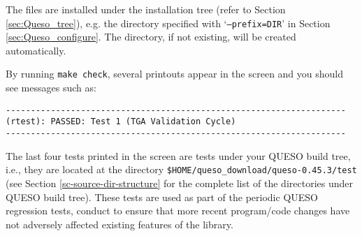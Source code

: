 The files are installed under the installation tree (refer to Section \ref{sec:Queso_tree}), e.g. the directory specified with `\texttt{--prefix=DIR}' in Section \ref{sec:Queso_configure}. The directory, if not existing, will be created automatically.%

% 
% 
% 
% 


By running \texttt{make check}, several printouts appear in the screen and you should see messages such as:
\begin{lstlisting}
--------------------------------------------------------------------
(rtest): PASSED: Test 1 (TGA Validation Cycle)
--------------------------------------------------------------------
\end{lstlisting}

The last four tests printed in  the screen are tests under your QUESO build tree, i.e., they are located at the  directory \verb+$HOME/queso_download/queso-0.45.3/test+ (see Section \ref{sc-source-dir-structure} for the complete list of the directories under QUESO build tree).      %
These tests are used as part of the periodic QUESO regression tests, conduct to ensure that more recent program/code changes have not adversely affected existing features of the library.



